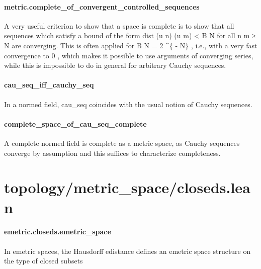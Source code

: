 \documentclass{article}
\begin{document}
\paragraph{metric.complete\_of\_convergent\_controlled\_sequences}
\par
A very useful criterion to show that a space is complete is to show that all sequences
which satisfy a bound of the form 
\colorbox[RGB]{253,246,227}{{{{\color[RGB]{101, 123, 131} dist (u n) (u m)  }}}{{{\color[RGB]{181, 137, 0} < }}}{{{\color[RGB]{101, 123, 131}  B N }}}} for all 
\colorbox[RGB]{253,246,227}{{{{\color[RGB]{101, 123, 131} n m  }}}{{{\color[RGB]{181, 137, 0} ≥ }}}{{{\color[RGB]{101, 123, 131}  N }}}} are
converging. This is often applied for 
\colorbox[RGB]{253,246,227}{{{{\color[RGB]{101, 123, 131} B N  }}}{{{\color[RGB]{181, 137, 0} = }}}{{{\color[RGB]{101, 123, 131}   }}}{{{\color[RGB]{108, 113, 196} 2 }}}{{{\color[RGB]{101, 123, 131} \textasciicircum{}\{ }}}{{{\color[RGB]{181, 137, 0} - }}}{{{\color[RGB]{101, 123, 131} N\} }}}}, i.e., with a very fast convergence to
\colorbox[RGB]{253,246,227}{{{{\color[RGB]{108, 113, 196} 0 }}}}, which makes it possible to use arguments of converging series, while this is impossible
to do in general for arbitrary Cauchy sequences.
\paragraph{cau\_seq\_iff\_cauchy\_seq}
\par
In a normed field, 
\colorbox[RGB]{253,246,227}{{{{\color[RGB]{101, 123, 131} cau\_seq }}}} coincides with the usual notion of Cauchy sequences.
\paragraph{complete\_space\_of\_cau\_seq\_complete}
\par
A complete normed field is complete as a metric space, as Cauchy sequences converge by
assumption and this suffices to characterize completeness.
\section{topology/metric\_space/closeds.lean}\paragraph{emetric.closeds.emetric\_space}
\par
In emetric spaces, the Hausdorff edistance defines an emetric space structure
on the type of closed subsets
\end{document}
